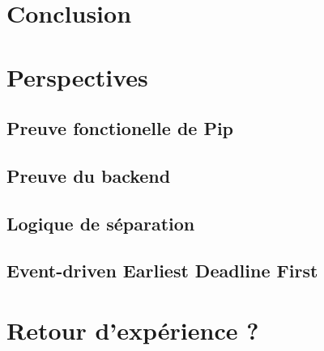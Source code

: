 
	\section{Conclusion}

	\section{Perspectives}
		\subsection{Preuve fonctionelle de Pip}
		\subsection{Preuve du backend}
		\subsection{Logique de séparation}
		\subsection{Event-driven Earliest Deadline First}

	\section{Retour d'expérience ?}
